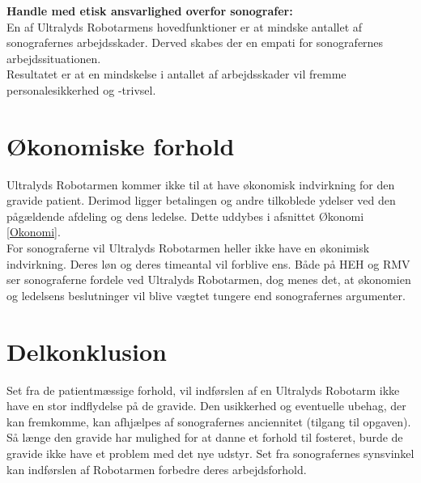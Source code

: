 \textbf{Handle med etisk ansvarlighed overfor sonografer:}\\
En af Ultralyds Robotarmens hovedfunktioner er at mindske antallet af sonografernes arbejdsskader. Derved skabes der en empati for sonografernes arbejdssituationen.\\
Resultatet er at en mindskelse i antallet af arbejdsskader vil fremme personalesikkerhed og -trivsel.   		

\section{Økonomiske forhold}
Ultralyds Robotarmen kommer ikke til at have økonomisk indvirkning for den gravide patient. Derimod ligger betalingen og andre tilkoblede ydelser ved den pågældende afdeling og dens ledelse. Dette uddybes i afsnittet Økonomi \ref{Okonomi}. \\
For sonograferne vil Ultralyds Robotarmen heller ikke have en økonimisk indvirkning. Deres løn og deres timeantal vil forblive ens. 
Både på HEH og RMV ser sonograferne fordele ved Ultralyds Robotarmen, dog menes det, at økonomien og ledelsens beslutninger vil blive vægtet tungere end sonografernes argumenter.  
 
\section{Delkonklusion }
Set fra de patientmæssige forhold, vil indførslen af en Ultralyds Robotarm ikke have en stor indflydelse på de gravide. Den usikkerhed og eventuelle ubehag, der kan fremkomme, kan afhjælpes af sonografernes anciennitet (tilgang til opgaven). Så længe den gravide har mulighed for at danne et forhold til fosteret, burde de gravide ikke have et problem med det nye udstyr. 
Set fra sonografernes synsvinkel kan indførslen af Robotarmen forbedre deres arbejdsforhold. 